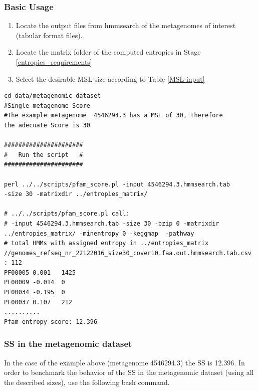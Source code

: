 \documentclass[a4paper,11pt]{report}
\begin{document}
\subsubsection{Basic Usage }

\begin{enumerate}
\item Locate the output files from hmmsearch of the metagenomes of interest (tabular format files). 
\item Locate the matrix folder of the computed entropies in Stage \ref{entropies_requirements} 
\item Select the desirable MSL size according to Table \ref{MSL-input}
\end{enumerate}
\begin{verbatim}
cd data/metagenomic_dataset
#Single metagenome Score 
#The example metagenome  4546294.3 has a MSL of 30, therefore 
the adecuate Score is 30

######################
#   Run the script   #
######################

perl ../../scripts/pfam_score.pl -input 4546294.3.hmmsearch.tab 
-size 30 -matrixdir ../entropies_matrix/  

# ../../scripts/pfam_score.pl call:
# -input 4546294.3.hmmsearch.tab -size 30 -bzip 0 -matrixdir 
../entropies_matrix/ -minentropy 0 -keggmap  -pathway 
# total HMMs with assigned entropy in ../entropies_matrix
//genomes_refseq_nr_22122016_size30_cover10.faa.out.hmmsearch.tab.csv : 112
PF00005 0.001   1425
PF00009 -0.014  0
PF00034 -0.195  0
PF00037 0.107   212
..........
Pfam entropy score: 12.396
\end{verbatim}
\subsubsection{SS in the metagenomic dataset}
In the case of the example above (metagenome 4546294.3) the SS is 12.396. In order to benchmark the behavior of the SS in the metagenomic dataset (using all the described sizes), use the following bash command. 
\end{document}
